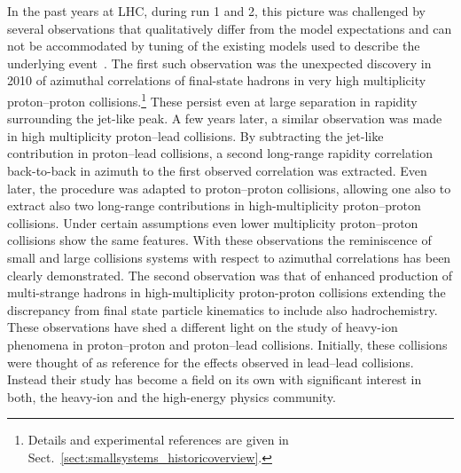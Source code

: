 \documentclass[../report.tex]{subfiles}
\begin{document}
In the past years at LHC, during run 1 and 2, this picture was challenged by several observations that qualitatively differ from the model expectations and can not be accommodated by tuning of the existing models used to describe the underlying event~\cite{Fischer:2016zzs}.
The first such observation was the unexpected discovery in 2010 of azimuthal correlations of final-state hadrons in very high multiplicity proton--proton collisions.\footnote{Details and experimental references are given in Sect.~\ref{sect:smallsystems_historicoverview}.} These persist even at large separation in rapidity surrounding the jet-like peak. A few years later, a similar observation was made in high multiplicity proton--lead collisions. By subtracting the jet-like contribution in proton--lead collisions, a second long-range rapidity correlation back-to-back in azimuth to the first observed correlation was extracted. Even later, the procedure was adapted to proton--proton collisions, allowing one also to extract also two long-range contributions in high-multiplicity proton--proton collisions. Under certain assumptions even lower multiplicity proton--proton collisions show the same features. With these observations the reminiscence of small and large collisions systems with respect to azimuthal correlations has been clearly demonstrated.
The second observation was that of enhanced production of multi-strange hadrons in high-multiplicity proton-proton collisions extending the discrepancy from final state particle kinematics to include also hadrochemistry. 
These observations have shed a different light on the study of heavy-ion phenomena in proton--proton and proton--lead collisions. Initially, these collisions were thought of as reference for the effects observed in lead--lead collisions. Instead their study has become a field on its own with significant interest in both, the heavy-ion and the high-energy physics community.
\end{document}
